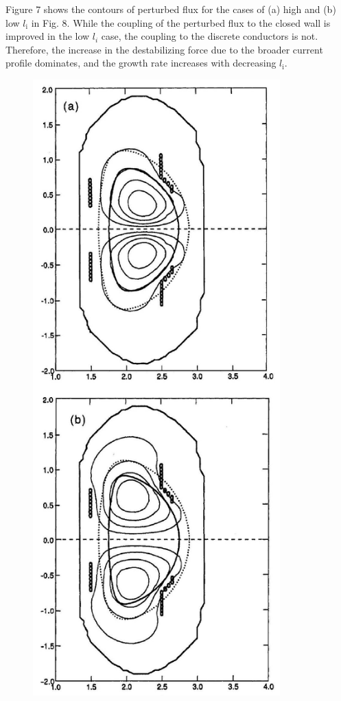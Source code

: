 \documentclass[utf8]{ctexart}
\begin{document}
\begin{sloppypar}
 Figure 7 shows the contours of perturbed flux for the cases of (a) high and (b) low $l_{\mathrm{i}}$ in Fig. 8. While the coupling of the perturbed flux to the closed wall is   improved in the low $l_{i}$ case, the coupling to the discrete conductors is not. Therefore, the increase in the destabilizing force due to the broader current profile dominates, and the growth rate increases with decreasing $l_{\mathrm{i}}$.
 \begin{figure}[H]
 	\centering
 	\includegraphics[max width=0.85\textwidth,max height=0.5\textheight]{2025_01_10_a0135324997886412d98g-8(1)}

\end{figure}
\end{sloppypar}
\end{document}
